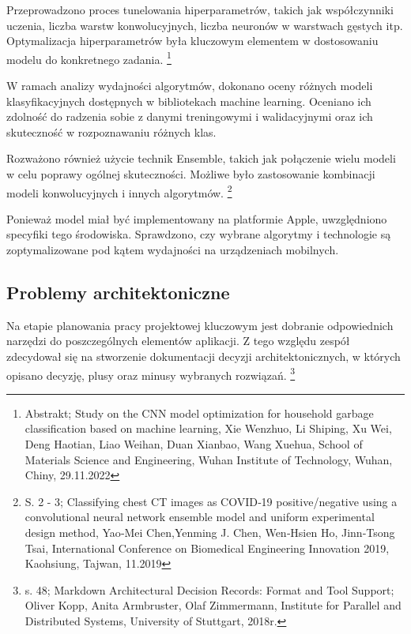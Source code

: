 \documentclass[12pt, a4paper, twoside, openany]{book}
\newcommand{\forceindent}{\leavevmode{\parindent=1.3em\indent}}
\begin{document}
Przeprowadzono proces tunelowania hiperparametrów, takich jak współczynniki uczenia, liczba warstw konwolucyjnych, liczba neuronów w warstwach gęstych itp.
Optymalizacja hiperparametrów była kluczowym elementem w dostosowaniu modelu do konkretnego zadania. \footnote{Abstrakt; Study on the CNN model optimization for household garbage classification based on machine learning, Xie Wenzhuo, Li Shiping, Xu Wei, Deng Haotian, Liao Weihan, Duan Xianbao, Wang Xuehua, School of Materials Science and Engineering, Wuhan Institute of Technology, Wuhan, Chiny, 29.11.2022 }

W ramach analizy wydajności algorytmów, dokonano oceny różnych modeli klasyfikacyjnych dostępnych w bibliotekach machine learning.
Oceniano ich zdolność do radzenia sobie z danymi treningowymi i walidacyjnymi oraz ich skuteczność w rozpoznawaniu różnych klas.

Rozważono również użycie technik Ensemble, takich jak połączenie wielu modeli w celu poprawy ogólnej skuteczności.
Możliwe było zastosowanie kombinacji modeli konwolucyjnych i innych algorytmów. \footnote{ S. 2 - 3; Classifying chest CT images as COVID‑19 positive/negative using a convolutional neural network ensemble model and uniform experimental design method, Yao‑Mei Chen,Yenming J. Chen, Wen‑Hsien Ho, Jinn‑Tsong Tsai, International Conference on Biomedical Engineering Innovation 2019, Kaohsiung, Tajwan, 11.2019}

Ponieważ model miał być implementowany na platformie Apple, uwzględniono specyfiki tego środowiska.
Sprawdzono, czy wybrane algorytmy i technologie są zoptymalizowane pod kątem wydajności na urządzeniach 
mobilnych.

\subsection{Problemy architektoniczne}

\forceindent Na etapie planowania pracy projektowej kluczowym jest dobranie odpowiednich narzędzi
do poszczególnych elementów aplikacji. Z tego względu zespół zdecydował się na stworzenie
dokumentacji decyzji architektonicznych, w których opisano decyzję, plusy oraz minusy wybranych rozwiązań. \footnote{s. 48; Markdown Architectural Decision Records: Format and Tool Support; Oliver Kopp, Anita Armbruster, Olaf Zimmermann, Institute for Parallel and Distributed Systems, University of Stuttgart, 2018r.}
\end{document}
